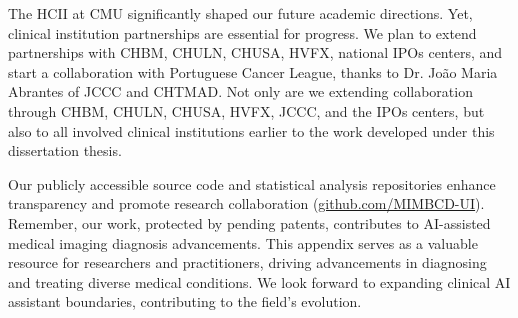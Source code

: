 The \ac{HCII} at \ac{CMU} significantly shaped our future academic directions.
Yet, clinical institution partnerships are essential for progress.
We plan to extend partnerships with \ac{CHBM}, \ac{CHULN}, \ac{CHUSA}, \ac{HVFX}, national \acp{IPO} centers, and start a collaboration with Portuguese Cancer League, thanks to Dr. João Maria Abrantes of \ac{JCCC} and \ac{CHTMAD}.
Not only are we extending collaboration through \ac{CHBM}, \ac{CHULN}, \ac{CHUSA}, \ac{HVFX}, \ac{JCCC}, and the \acp{IPO} centers, but also to all involved clinical institutions earlier to the work developed under this dissertation thesis.

Our publicly accessible source code and statistical analysis repositories enhance transparency and promote research collaboration (\href{https://github.com/MIMBCD-UI}{github.com/MIMBCD-UI}).
Remember, our work, protected by pending patents, contributes to \ac{AI}-assisted medical imaging diagnosis advancements.
This appendix serves as a valuable resource for researchers and practitioners, driving advancements in diagnosing and treating diverse medical conditions.
We look forward to expanding clinical \ac{AI} assistant boundaries, contributing to the field's evolution.